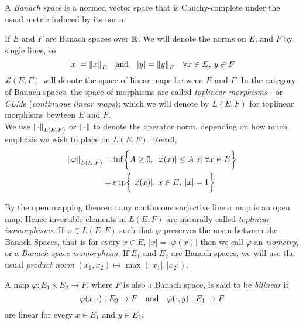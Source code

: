 \documentclass[../main-manifolds.tex]{subfiles}
\begin{document}
\newpage
{}
A \emph{Banach space} is a normed vector space that is Cauchy-complete under the usual metric induced by its norm. 

If $E$ and $F$ are Banach spaces over $\mathbb{R}$. We will denote the norms on $E$, and $F$ by single lines, so 
\[
    \vert x\vert = \norm{x}_E\qqtext{and} \vert y\vert = \norm{y}_F\quad\forall x\in E,\: y\in F
\]
$\mathcal{L}(E,F)$ will denote the space of linear maps between $E$ and $F$. In the category of Banach spaces, the space of morphisms are called \emph{toplinear morphisms} - or \emph{CLM}s (\emph{continuous linear maps}); which we will denote by $L(E,F)$ for toplinear morphisms bewteen $E$ and $F$. \\

We use $\norm{\cdot}_{L(E,F)}$ or $\norm{\cdot}$ to denote the operator norm, depending on how much emphasis we wish to place on $L(E,F)$. Recall,
\begin{align*}
\norm{\varphi}_{L(E,F)} &= \inf\biggl\{{A\geq 0,\: \vert\varphi(x)\vert\leq A\vert x\vert\:\forall x\in E}\biggr\}\\
&= \sup\biggl\{{\vert\varphi(x)\vert,\: x\in E,\: \vert x\vert=1}\biggr\}
\end{align*}

By the open mapping theorem: any continuous surjective linear map is an open map. Hence invertible elements in $L(E,F)$ are naturally called \emph{toplinear isomorphisms}. If $\varphi\in L(E,F)$ such that $\varphi$ preserves the norm between the Banach Spaces, that is for every $x\in E$, $\vert x\vert = \vert \varphi(x)\vert$ then we call $\varphi$ an \emph{isometry}, or a \emph{Banach space isomorphism}. If $E_1$ and $E_2$ are Banach spaces, we will use the usual \emph{product norm} $(x_1, x_2)\mapsto \max(\vert x_1\vert,\vert x_2\vert)$. 
\begin{definition}
A map $\varphi: E_1\times E_2\to F$, where $F$ is also a Banach space, is said to be \emph{bilinear} if
\[
    \varphi(x,\cdot): E_2\to F\qqtext{and}\varphi(\cdot,y): E_1\to F
\]
are linear for every $x\in E_1$ and $y\in E_2$.     
\end{definition}
\end{document}
